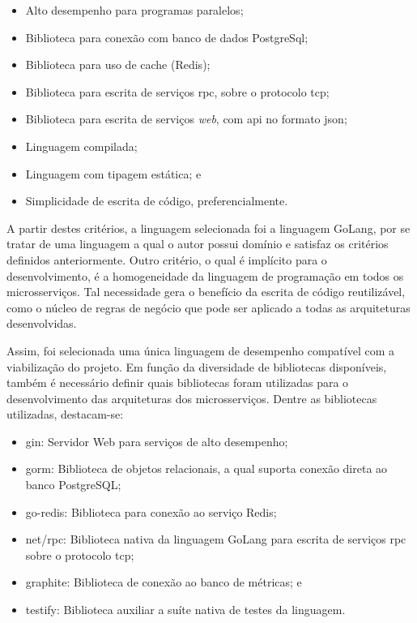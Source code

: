 \begin{itemize}
  \item Alto desempenho para programas paralelos;
  \item Biblioteca para conexão com banco de dados PostgreSql;
  \item Biblioteca para uso de cache (Redis);
  \item Biblioteca para escrita de serviços \ac{rpc}, sobre o protocolo \ac{tcp};
  \item Biblioteca para escrita de serviços \textit{web}, com \ac{api} no formato \ac{json};
  \item Linguagem compilada;
  \item Linguagem com tipagem estática; e
  \item Simplicidade de escrita de código, preferencialmente.
\end{itemize}



A partir destes critérios, a linguagem selecionada foi a linguagem GoLang, por se tratar de uma linguagem a qual o autor possui domínio e satisfaz os critérios definidos anteriormente.
%
Outro critério, o qual é implícito para o desenvolvimento, é a homogeneidade da linguagem de programação em todos os microsserviços.
%
Tal necessidade gera o benefício da escrita de código reutilizável, como o núcleo de regras de negócio que pode ser aplicado a todas as arquiteturas desenvolvidas.



Assim, foi selecionada uma única linguagem de desempenho compatível com a viabilização do projeto.
%
Em função da diversidade de bibliotecas disponíveis, também é necessário definir quais bibliotecas foram utilizadas para o desenvolvimento das arquiteturas dos microsserviços.
%
Dentre as bibliotecas utilizadas, destacam-se:



\begin{itemize}
  \item gin: Servidor Web para serviços de alto desempenho;
  \item gorm: Biblioteca de objetos relacionais, a qual suporta conexão direta ao banco PostgreSQL;
  \item go-redis: Biblioteca para conexão ao serviço Redis;
  \item net/rpc: Biblioteca nativa da linguagem GoLang para escrita de serviços \ac{rpc} sobre o protocolo \ac{tcp};
  \item graphite: Biblioteca de conexão ao banco de métricas; e
  \item testify: Biblioteca auxiliar a suíte nativa de testes da linguagem.
\end{itemize}



